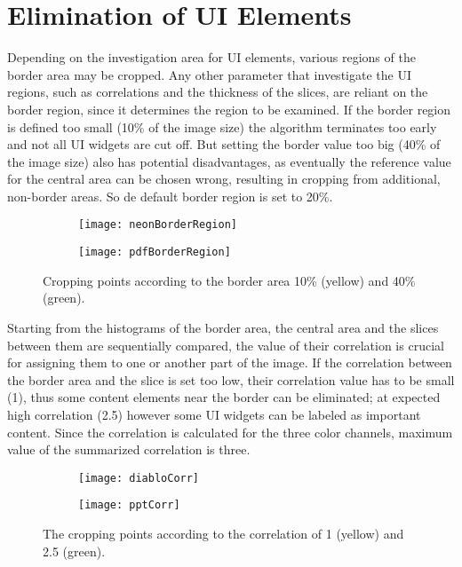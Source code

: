 \documentclass[draft,final]{vutinfth} %
\begin{document}
	\section{Elimination of UI Elements} 
	Depending on the investigation area for UI elements, various regions of the border area may be cropped. 
	Any other parameter that investigate the UI regions, such as correlations and the thickness of the slices, are reliant on the border region, since it determines the region to be examined. 
	If the border region is defined too small (10\% of the image size) the algorithm terminates too early and not all UI widgets are cut off.
	But setting the border value too big (40\% of the image size) also has potential disadvantages, as eventually the reference value for the central area can be chosen wrong, resulting in cropping from additional, non-border areas.
	So de default border region is set to 20\%.\par
	\begin{figure}[H]
		\centering
		\begin{subfigure}[b]{0.45\columnwidth}
			\centering
			\texttt{[image: neonBorderRegion]}
			\label{fig:res:neon}
		\end{subfigure}
		\begin{subfigure}[b]{0.45\columnwidth}
			\centering
			\texttt{[image: pdfBorderRegion]}
			\label{fig:res:pdf}
		\end{subfigure}
		\caption{Cropping points according to the border area 10\% (yellow) and 40\% (green).}
	\end{figure} 
	Starting from the histograms of the border area, the central area and the slices between them are sequentially compared, the value of their correlation is crucial for assigning them to one or another part of the image.
	If the correlation between the border area and the slice is set too low, their correlation value has to be small (1), thus some content elements near the border can be eliminated; at expected high correlation (2.5) however some UI widgets can be labeled as important content.
	Since the correlation is calculated for the three color channels, maximum value of the summarized correlation is three.\par
	\begin{figure}[H]
		\centering
		\begin{subfigure}[b]{0.45\columnwidth}
			\centering
			\texttt{[image: diabloCorr]}
			\label{fig:res:corr1}
		\end{subfigure}
		\begin{subfigure}[b]{0.45\columnwidth}
			\centering
			\texttt{[image: pptCorr]}
			\label{fig:res:corr2}
		\end{subfigure}
		\caption{The cropping points according to the correlation of 1 (yellow) and 2.5 (green).}
	\end{figure} 
\end{document}
